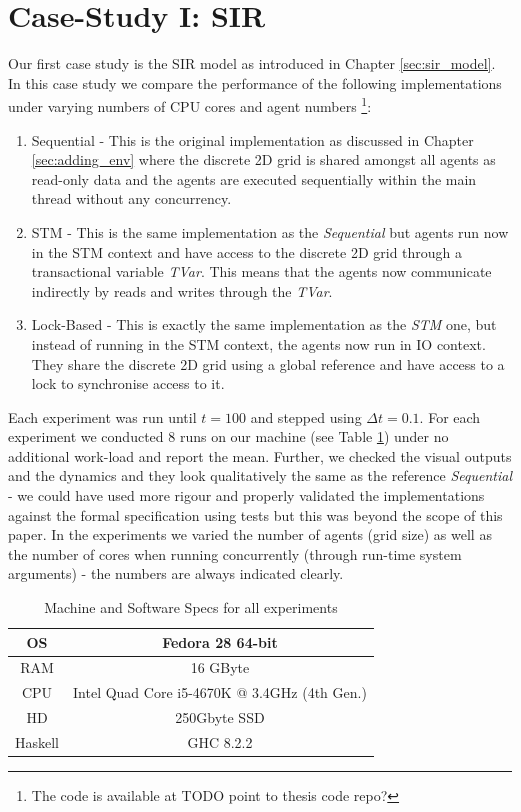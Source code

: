 \section{Case-Study I: SIR}
\label{sec:concurrent_sir}
Our first case study is the SIR model as introduced in Chapter \ref{sec:sir_model}. In this case study we compare the performance of the following implementations under varying numbers of CPU cores and agent numbers \footnote{The code is available at TODO point to thesis code repo?}:

\begin{enumerate}
	\item Sequential - This is the original implementation as discussed in Chapter \ref{sec:adding_env} where the discrete 2D grid is shared amongst all agents as read-only data and the agents are executed sequentially within the main thread without any concurrency.
	\item STM - This is the same implementation as the \textit{Sequential} but agents run now in the STM context and have access to the discrete 2D grid through a transactional variable \textit{TVar}. This means that the agents now communicate indirectly by reads and writes through the \textit{TVar}.
	\item Lock-Based - This is exactly the same implementation as the \textit{STM} one, but instead of running in the STM context, the agents now run in IO context. They share the discrete 2D grid using a global reference and have access to a lock to synchronise access to it.
\end{enumerate}

Each experiment was run until $t = 100$ and stepped using $\Delta t = 0.1$. For each experiment we conducted 8 runs on our machine (see Table \ref{tab:machine_specs}) under no additional work-load and report the mean. Further, we checked the visual outputs and the dynamics and they look qualitatively the same as the reference \textit{Sequential} - we could have used more rigour and properly validated the implementations against the formal specification using tests but this was beyond the scope of this paper. In the experiments we varied the number of agents (grid size) as well as the number of cores when running concurrently (through run-time system arguments) - the numbers are always indicated clearly.

\begin{table}
	\centering
	\begin{tabular}{ c || c }
		OS & Fedora 28 64-bit \\ \hline
		RAM & 16 GByte \\ \hline
		CPU & Intel Quad Core i5-4670K @ 3.4GHz (4th Gen.) \\ \hline
		HD & 250Gbyte SSD \\ \hline
		Haskell & GHC 8.2.2
	\end{tabular}
	
	\caption{Machine and Software Specs for all experiments}
	\label{tab:machine_specs}
\end{table}

